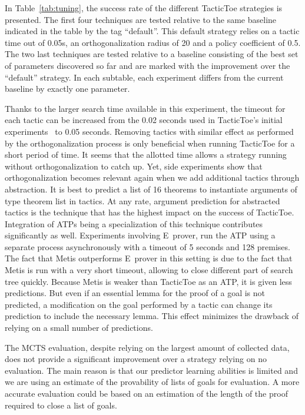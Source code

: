 \documentclass[runningheads,a4paper,draft]{svjour3}
\def\eprover{\textsf{E~prover}\xspace}
\def\metis{\textsf{Metis}\xspace}
\def\tactictoe{\textsf{TacticToe}\xspace}
\begin{document}
In Table~\ref{tab:tuning}, the success rate of the different \tactictoe
strategies is presented.
The first four techniques are tested relative to the same baseline indicated in
the table by the tag ``default''.  This default strategy relies on a tactic
time out of 0.05s, an orthogonalization radius of 20 and a policy coefficient of
0.5.
The two last techniques are tested relative
to a baseline consisting of the best set of parameters discovered so far and
are marked with the improvement over the ``default'' strategy.
In each subtable, each experiment differs from the current baseline by exactly
one parameter.

Thanks to the larger search time available in this experiment, the timeout for
each tactic can be increased from the 0.02 seconds used in \tactictoe's initial
experiments~\cite{tgckju-lpar17} to 0.05
seconds. Removing tactics with similar effect as performed by the
orthogonalization process is only beneficial when running \tactictoe for a short
period of time. It seems that the allotted time allows a strategy
running without orthogonalization to catch up. Yet, side experiments show
that orthogonalization becomes relevant again when we add additional
tactics through abstraction.
It is best to predict a list of 16 theorems to instantiate arguments of type
theorem list in tactics. At any rate, argument prediction for abstracted
tactics is the technique that has the highest impact on the success of
\tactictoe. Integration of ATPs being a specialization of this technique
contributes significantly as well. Experiments involving \eprover, run the ATP
using a separate process asynchronously with a timeout of 5 seconds and 128 premises.
The fact that \metis outperforms \eprover in this setting is due to the fact
that \metis is run with a very short timeout, allowing to close different part
of search tree quickly. Because \metis is weaker than \tactictoe as an ATP, it
is given less predictions. But even if an essential lemma for the proof of a
goal is not predicted, a modification on the goal performed by a tactic can
change its prediction to include the necessary lemma.
This effect minimizes the drawback of relying on a small number of predictions.

The MCTS evaluation, despite relying on the largest amount of collected data,
does not provide a significant improvement over a strategy relying on no
evaluation. The main reason is that our predictor learning abilities is
limited and we are using an estimate of the provability of lists of goals for
evaluation. A more accurate evaluation could be based on an estimation of the
length of the proof required to close a list of goals.
\end{document}

